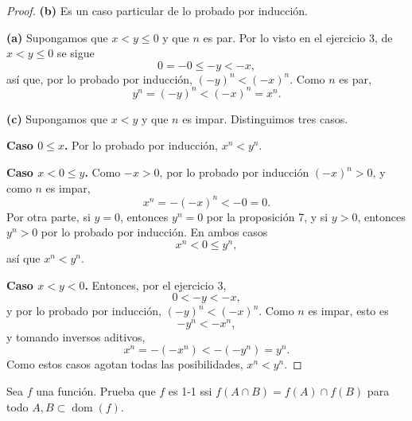 \documentclass[12pt,a4paper]{article}
\begin{document}
\begin{proof}
        \textbf{(b)} Es un caso particular de lo probado por inducción.

        \textbf{(a)} Supongamos que $x<y\leq0$ y que $n$ es par. Por lo visto en el ejercicio 3, de $x<y\leq0$ se sigue
        \begin{equation*}
            0=-0\leq-y<-x,
        \end{equation*}
        así que, por lo probado por inducción, $(-y)^{n}<(-x)^{n}$. Como $n$ es par,
        \begin{equation*}
            y^{n}=(-y)^{n}<(-x)^{n}=x^{n}.
        \end{equation*}

        \textbf{(c)} Supongamos que $x<y$ y que $n$ es impar. Distinguimos tres casos.

        \textbf{Caso $0\leq x$.} Por lo probado por inducción, $x^{n}<y^{n}$.

        \textbf{Caso $x<0\leq y$.} Como $-x>0$, por lo probado por inducción $(-x)^{n}>0$, y como $n$ es impar,
        \begin{equation*}
            x^{n}=-(-x)^{n}<-0=0.
        \end{equation*}
        Por otra parte, si $y=0$, entonces $y^{n}=0$ por la proposición 7, y si $y>0$, entonces $y^{n}>0$ por lo probado por inducción. En ambos casos
        \begin{equation*}
            x^{n}<0\leq y^{n},
        \end{equation*}
        así que $x^{n}<y^{n}$.

        \textbf{Caso $x<y<0$.} Entonces, por el ejercicio 3,
        \begin{equation*}
            0<-y<-x,
        \end{equation*}
        y por lo probado por inducción, $(-y)^{n}<(-x)^{n}$. Como $n$ es impar, esto es
        \begin{equation*}
            -y^{n}<-x^{n},
        \end{equation*}
        y tomando inversos aditivos,
        \begin{equation*}
            x^{n}=-(-x^{n})<-(-y^{n})=y^{n}.
        \end{equation*}
        Como estos casos agotan todas las posibilidades, $x^{n}<y^{n}$.
    \end{proof}

    \begin{problema}
        Sea $f$ una función. Prueba que $f$ es 1-1 ssi $f(A\cap B)=f(A)\cap f(B)$ para todo $A,B\subset\operatorname{dom}(f)$.
    \end{problema}
\end{document}
